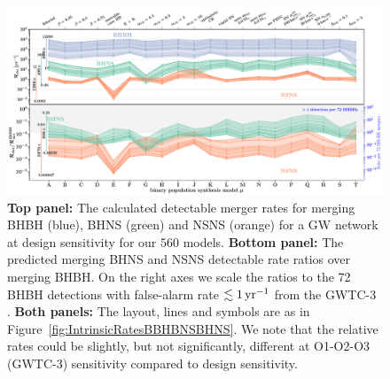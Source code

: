 \documentclass[fleqn,usenatbib]{mnras}
\newcommand{\yearmin}{\ensuremath{\,\rm{yr}^{-1}}\xspace}
\newcommand{\Nmodels}{\ensuremath{560}\xspace}
\begin{document}
\begin{figure}
    \centering
\includegraphics[width=1.0\textwidth]{figures/Rates_observed_ratio_bckground.pdf} 
    \caption{ \textbf{Top panel:} The calculated detectable merger rates for merging BHBH (blue), BHNS (green) and NSNS (orange)  for a \ac{GW} network at design sensitivity for our \Nmodels  models.  \textbf{Bottom panel:} The predicted merging BHNS and NSNS detectable rate ratios over merging BHBH. On the right axes we scale the ratios to the 72 BHBH detections with false-alarm rate $\lesssim 1 \yearmin$ from the GWTC-3  \citep{Abbott:2021GWTC3pop}.      \textbf{Both panels:} The layout, lines and symbols are as in Figure~\ref{fig:IntrinsicRatesBBHBNSBHNS}. We note that the relative rates could be slightly, but not significantly, different at O1-O2-O3 (GWTC-3) sensitivity compared to design sensitivity. \href{https://github.com/FloorBroekgaarden/Double-Compact-Object-Mergers/blob/main/plottingCode/Fig_3/Rates_observed_ratio_bckground.pdf}{\faFileImage} \href{https://github.com/FloorBroekgaarden/Double-Compact-Object-Mergers/blob/main/plottingCode/Fig_3/make_figure_3.ipynb}{\faBook}}
    \label{fig:ObservedRatesRatiosBBHBNSBHNS}
\end{figure}
%
%
\end{document}
